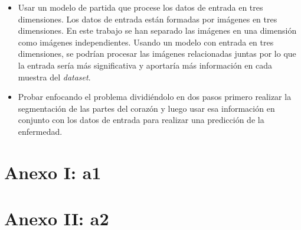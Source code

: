 \documentclass[12pt,a4paper]{article}
\begin{document}
\begin{itemize}
\item Usar un modelo de partida que procese los datos de entrada en tres dimensiones. Los datos de entrada están formadas por imágenes en tres dimensiones. En este trabajo se han separado las imágenes en una dimensión como imágenes independientes. Usando un modelo con entrada en tres dimensiones, se podrían procesar las imágenes relacionadas juntas por lo que la entrada sería más significativa y aportaría más información en cada muestra del \textit{dataset}.

\item Probar enfocando el problema dividiéndolo en dos pasos primero realizar la segmentación de las partes del corazón y luego usar esa información en conjunto con los datos de entrada para realizar una predicción de la enfermedad.
\end{itemize}


\newpage
\appendix
\addappheadtotoc
\appendixpage
\section{Anexo I: a1}\label{anexo1}

\newpage
\section{Anexo II: a2}\label{anexo2}

\newpage
\nocite{*}
\renewcommand\refname{Bibliografía}



\clearpage


\printglossary[type=\acronymtype,style=long,title={Índice de acrónimos}]

\end{document}
